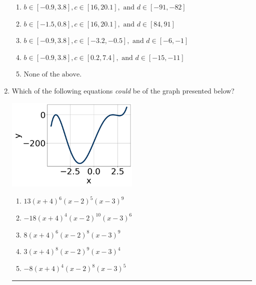 \documentclass[14pt]{extbook}
\newcommand{\litem}[1]{\item#1\hspace*{-1cm}\rule{\textwidth}{0.4pt}}
\begin{document}
\begin{enumerate}
{\begin{enumerate}[label=\Alph*.]
\item \( b \in [-0.9, 3.8], c \in [16, 20.1], \text{ and } d \in [-91, -82] \)
\item \( b \in [-1.5, 0.8], c \in [16, 20.1], \text{ and } d \in [84, 91] \)
\item \( b \in [-0.9, 3.8], c \in [-3.2, -0.5], \text{ and } d \in [-6, -1] \)
\item \( b \in [-0.9, 3.8], c \in [0.2, 7.4], \text{ and } d \in [-15, -11] \)
\item \( \text{None of the above.} \)

\end{enumerate} }
\litem{
Which of the following equations \textit{could} be of the graph presented below?
\begin{center}
    \includegraphics[width=0.5\textwidth]{../Figures/polyGraphToFunctionC.png}
\end{center}
\begin{enumerate}[label=\Alph*.]
\item \( 13(x + 4)^{6} (x - 2)^{5} (x - 3)^{9} \)
\item \( -18(x + 4)^{4} (x - 2)^{10} (x - 3)^{6} \)
\item \( 8(x + 4)^{6} (x - 2)^{8} (x - 3)^{9} \)
\item \( 3(x + 4)^{8} (x - 2)^{9} (x - 3)^{4} \)
\item \( -8(x + 4)^{4} (x - 2)^{8} (x - 3)^{5} \)


\end{enumerate}}
\end{enumerate}
\end{document}
